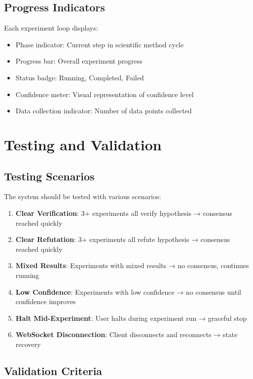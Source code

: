 \documentclass{book}
\begin{document}
\section{Progress Indicators}

Each experiment loop displays:

\begin{itemize}
    \item Phase indicator: Current step in scientific method cycle
    \item Progress bar: Overall experiment progress
    \item Status badge: Running, Completed, Failed
    \item Confidence meter: Visual representation of confidence level
    \item Data collection indicator: Number of data points collected
\end{itemize}

\chapter{Testing and Validation}

\section{Testing Scenarios}

The system should be tested with various scenarios:

\begin{enumerate}
    \item \textbf{Clear Verification}: 3+ experiments all verify hypothesis → consensus reached quickly
    \item \textbf{Clear Refutation}: 3+ experiments all refute hypothesis → consensus reached quickly
    \item \textbf{Mixed Results}: Experiments with mixed results → no consensus, continues running
    \item \textbf{Low Confidence}: Experiments with low confidence → no consensus until confidence improves
    \item \textbf{Halt Mid-Experiment}: User halts during experiment run → graceful stop
    \item \textbf{WebSocket Disconnection}: Client disconnects and reconnects → state recovery
\end{enumerate}

\section{Validation Criteria}
\end{document}
